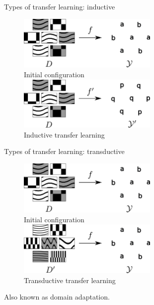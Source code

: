\documentclass[xcolor=pdftex,dvipsnames,table,mathserif]{beamer}
\begin{document}
\begin{frame}{Types of transfer learning: inductive}

\begin{figure}[ht]
  \centering
  \includegraphics[width=0.6\textwidth]{tl_0}\\
  Initial configuration\\
  \vspace{2em}
  \includegraphics[width=0.6\textwidth]{tl_inductive}\\
  Inductive transfer learning
\end{figure}


\end{frame}


\begin{frame}{Types of transfer learning: transductive}

\begin{figure}[ht]
  \centering
  \includegraphics[width=0.6\textwidth]{tl_0}\\
  Initial configuration\\
  \vspace{2em}
  \includegraphics[width=0.6\textwidth]{tl_transductive}\\
  Transductive transfer learning
\end{figure}

\begin{alertblock}{}
  Also known as domain adaptation.
\end{alertblock}

\end{frame}
\end{document}
